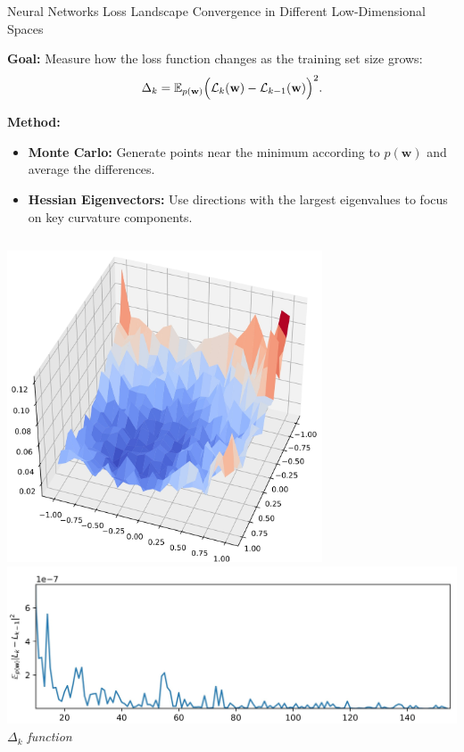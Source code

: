 \documentclass{beamer}
\begin{document}
\begin{frame}{Neural Networks Loss Landscape Convergence in Different Low-Dimensional Spaces}

    \textbf{Goal:} Measure how the loss function changes as the training set size grows:
    \[
        \Delta_k = \mathbb{E}_{p(\mathbf{w})}\Bigl(\mathcal{L}_{k}(\mathbf{w}) - \mathcal{L}_{k-1}(\mathbf{w})\Bigr)^2.
    \]

    \textbf{Method:}
    \begin{itemize}
        \item \textbf{Monte Carlo:} Generate points near the minimum according to $p(\mathbf{w})$ and average the differences.
        \item \textbf{Hessian Eigenvectors:} Use directions with the largest eigenvalues to focus on key curvature components.
    \end{itemize}

    \begin{columns}[t]
        \centering
        \hspace*{-2cm}
        \includegraphics[width=0.70\textwidth]{img/LS_16.jpg}\\

        \centering
        \vspace*{-3cm}
        \hspace*{-2.2cm}
        \includegraphics[width=1.375\textwidth]{img/D_32.jpg}\\
        \hspace*{-1.2cm}
        \scriptsize \textit{$\Delta_k$ function}
    \end{columns}

\end{frame}
\end{document}
